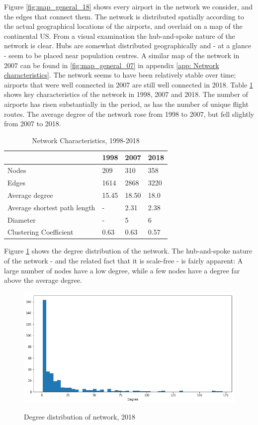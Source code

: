 Figure \ref{fig:map_general_18} shows every airport in the network we consider, and the edges that connect them. The network is distributed spatially according to the actual geographical locations of the airports, and overlaid on a map of the continental US. From a visual examination the hub-and-spoke nature of the network is clear. Hubs are somewhat distributed geographically and - at a glance - seem to be placed near population centres. A similar map of the network in 2007 can be found in \ref{fig:map_general_07} in appendix \ref{app: Network characteristics}. The network seems to have been relatively stable over time; airports that were well connected in 2007 are still well connected in 2018. Table \ref{tab: temporal} shows key characteristics of the network in 1998, 2007 and 2018. The number of airports has risen substantially in the period, as has the number of unique flight routes. The average degree of the network rose from 1998 to 2007, but fell slightly from 2007 to 2018. 
\begin{table}[H]
\centering 
\caption{Network Characteristics, 1998-2018}
\label{tab: temporal}
\begin{tabular}{|l|l|l|l|}
\hline
\textbf{}                    & \textbf{1998} & \textbf{2007} & \textbf{2018} \\ \hline
Nodes                        & 209           & 310           & 358           \\
Edges                        & 1614          & 2868          & 3220          \\
Average degree               & 15.45         & 18.50         & 18.0          \\
Average shortest path length & -             & 2.31          & 2.38          \\ 
Diameter                     & -             & 5             & 6 
     \\
Clustering Coefficient       & 0.63          & 0.63          & 0.57          \\ \hline
\end{tabular}
\end{table}
Figure \ref{fig:degreeDistribution} shows the degree distribution of the network. The hub-and-spoke nature of the network - and the related fact that it is scale-free - is fairly apparent: A large number of nodes have a low degree, while a few nodes have a degree far above the average degree. 
\begin{figure}[H]
  \centering
  \caption{Degree distribution of network, 2018}
    \includegraphics[width=0.6 \textwidth]{Exam/Figures/degreeDistribution.png}
  \label{fig:degreeDistribution}
\end{figure}
